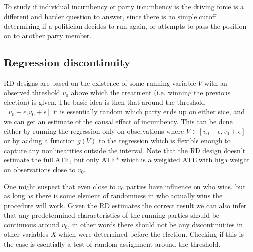 To study if individual incumbency or party incumbency is the driving force is a different and harder question to answer, since there is no simple cutoff determining if a politician decides to run again, or attempts to pass the position on to another party member.

\subsection{Regression discontinuity}
RD designs are based on the existence of some running variable $V$ with an observed threshold $v_0$ above which the treatment (i.e. winning the previous election) is given. The basic idea is then that around the threshold $[v_0 - \epsilon, v_0 + \epsilon]$ it is essentially random which party ends up on either side, and we can get an estimate of the causal effect of incumbency. This can be done either by running the regression only on observations where $V\in[v_0 - \epsilon, v_0 + \epsilon]$ or by adding a function $g(V)$ to the regression which is flexible enough to capture any nonlinearities outside the interval. Note that the RD design doesn't estimate the full ATE, but only ATE* which is a weighted ATE with high weight on observations close to $v_0$. 

One might suspect that even close to $v_0$ parties have influence on who wins, but as long as there is some element of randomness in who actually wins the procedure will work. Given the RD estimates the correct result we can also infer that any predetermined characteristics of the running parties should be continuous around $v_0$, in other words there should not be any discontinuities in other variables $X$ which were determined before the election. Checking if this is the case is esentially a test of random assignment around the threshold.